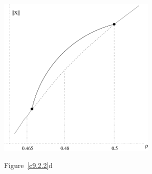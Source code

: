 \documentclass{ximera}
\begin{document}
\begin{computerExercise}
\begin{solution}
\begin{figure}[htb]
			\centerline{%
			\includegraphics[width=3.0in]{exfigure/9-2-2d.pdf}}
		\centerline{Figure~\ref{c9.2.2}d}
\end{figure}




\end{solution}
\end{computerExercise}
\end{document}
